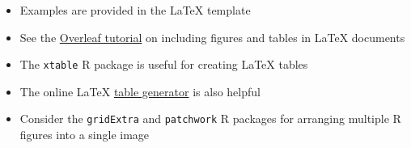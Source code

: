 \documentclass[11pt]{article}
\begin{document}
\begin{itemize}
\item Examples are provided in the LaTeX template
\item See the \href{https://www.overleaf.com/learn/latex/How_to_Write_a_Thesis_in_LaTeX_(Part_3)\%3A_Figures\%2C_Subfigures_and_Tables}{Overleaf tutorial} on including figures and tables in LaTeX documents
\item The \verb;xtable; R package is useful for creating LaTeX tables
\item The online LaTeX \href{https://www.tablesgenerator.com/}{table generator} is also helpful
\item Consider the \verb;gridExtra; and \verb;patchwork; R packages for arranging multiple R figures into a single image
\end{itemize}
\end{document}
